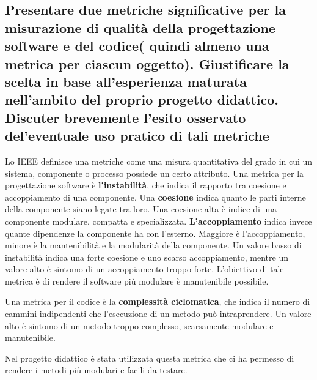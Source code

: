 \subsection{Presentare due metriche significative per la misurazione di qualità della progettazione software e del codice( quindi almeno una metrica per ciascun oggetto). Giustificare la scelta in base all'esperienza maturata nell'ambito del proprio progetto didattico. Discuter brevemente l'esito osservato del'eventuale uso pratico di tali metriche}

Lo IEEE definisce una metriche come una misura quantitativa del grado in cui un sistema, componente o processo possiede un certo attributo.
Una metrica per la progettazione software è \textbf{l'instabilità}, che indica il rapporto tra coesione e accoppiamento di una componente. Una \textbf{coesione} indica quanto le parti interne della componente siano legate tra loro. Una coesione alta è indice di una componente modulare, compatta e specializzata. \textbf{L'accoppiamento} indica invece quante dipendenze la componente ha con l'esterno. Maggiore è l'accoppiamento, minore è la mantenibilità e la modularità della componente. Un valore basso di instabilità indica una forte coesione e uno scarso accoppiamento, mentre un valore alto è sintomo di un accoppiamento troppo forte. L'obiettivo di tale metrica è di rendere il software più modulare è manutenibile possibile.

Una metrica per il codice è la\textbf{ complessità ciclomatica}, che indica il numero di cammini indipendenti che l'esecuzione di un metodo può intraprendere. Un valore alto è sintomo di un metodo troppo complesso, scarsamente modulare e manutenibile. 

Nel progetto didattico è stata utilizzata questa metrica che ci ha permesso di rendere i metodi più modulari e facili da testare.